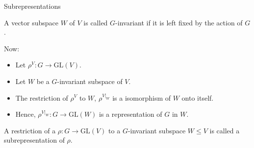 \documentclass[handout, 10pt]{beamer}
\newcommand{\GL}{\text{GL}}
\begin{document}
	\begin{frame}[allowframebreaks]{Subrepresentations}
			
		\begin{definition}
			A vector subspace $W$ of $V$ is called $G$-invariant if it is left fixed by the action of $G$.
		\end{definition}

		\begin{block}{Now:}
			\begin{itemize}
				\item Let $\rho^V : G \rightarrow \GL(V)$.
				
				\item Let $W$ be a $G$-invariant subspace of $V$.
				
				\item The restriction of $\rho^V$ to $W$, $\rho^{V|_W}$ is a isomorphism of $W$ onto itself.
				
				\item Hence, $\rho^{V|_W}: G \rightarrow \GL(W)$ is a representation of $G$ in $W$.
			\end{itemize}
		\end{block}
		
		\begin{definition}[Subrepresentation]
			A restriction of a $\rho: G \rightarrow \GL(V)$ to a $G$-invariant subspace $W \leq V$ is called a subrepresentation of $\rho$.
		\end{definition}
		

\end{frame}
\end{document}
